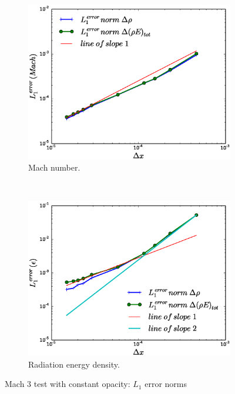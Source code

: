 \documentclass[times,doublespace]{fldauth}%
\begin{document}
\begin{figure}[ht]
    \begin{subfigure}{0.5\textwidth}
    \centering
    \includegraphics[width=\linewidth]{figures/cst-xs/mach-3/mass-energy-diff-scd-method-mach-number-convergence.eps}
    \caption{Mach number.}\label{fig:mach-3-cst-xs-mach-conv}
    \end{subfigure}
    ~
    \begin{subfigure}{0.5\textwidth}
    \centering
    \includegraphics[width=\linewidth]{figures/cst-xs/mach-3/mass-energy-diff-scd-method-radiation-convergence.eps}
    \caption{Radiation energy density.}\label{fig:mach-3-cst-xs-radiation-conv}
    \end{subfigure}        
\caption{Mach $3$ test with constant opacity: $L_1$ error norms}\label{fig:mach-3-cst-xs-conv}    
\end{figure}
%
\end{document}
